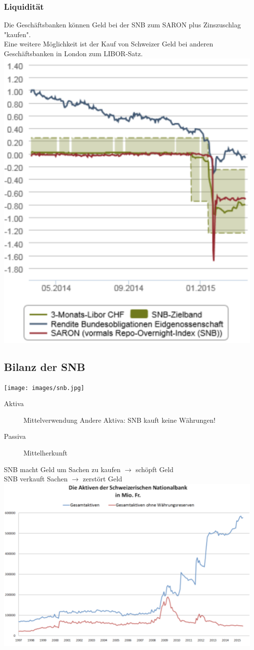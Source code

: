\subsubsection{Liquidität}
\begin{multicols}{2}
	Die Geschäftsbanken können Geld bei der SNB zum SARON plus Zinszuschlag "kaufen".\\
	Eine weitere Möglichkeit ist der Kauf von Schweizer Geld bei anderen Geschäftsbanken in London zum LIBOR-Satz.
	\vfill\null
	\columnbreak
	\includegraphics[width=0.5\linewidth]{images/libor.png}
\end{multicols}

\subsection{Bilanz der SNB}
\texttt{[image: images/snb.jpg]}
\begin{multicols}{2}
	\begin{description}
		\item[Aktiva] Mittelverwendung
		\subitem Andere Aktiva: SNB kauft keine Währungen!
		\item[Passiva] Mittelherkunft
	\end{description}
	SNB macht Geld um Sachen zu kaufen $\rightarrow$ schöpft Geld\\
	SNB verkauft Sachen $\rightarrow$ zerstört Geld
	\vfill\null
	\columnbreak
	\includegraphics[width=\linewidth]{images/aktiven.png}
\end{multicols}

